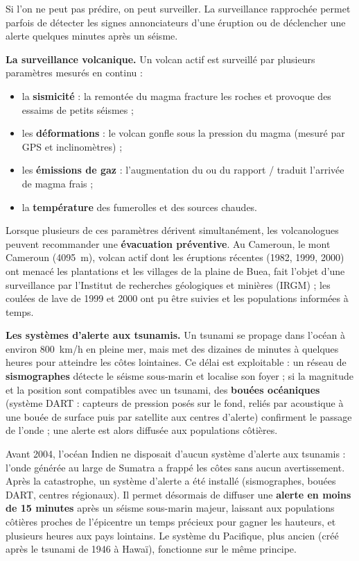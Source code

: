 \documentclass[11pt]{article}
\newcommand{\cle}[1]{{\popxbold\color{popdark}#1}}
\newcounter{popsec}
\newcounter{popsub}
\newcommand{\courssub}[1]{%
  \stepcounter{popsub}%
  \par\vspace{9pt}\noindent{\popxbold\fontsize{11.5}{13}\selectfont\color{popink}{\color{poporange}\thepopsec.\thepopsub}\hspace{6pt}#1}\par\nopagebreak\vspace{4pt}
}
\begin{document}
\courssub{La surveillance : des volcans aux tsunamis}

Si l'on ne peut pas prédire, on peut \cle{surveiller}. La surveillance rapprochée permet parfois de détecter les signes annonciateurs d'une éruption ou de déclencher une alerte quelques minutes après un séisme.

\textbf{La surveillance volcanique.} Un volcan actif est surveillé par plusieurs paramètres mesurés en continu :
\begin{itemize}
\item la \textbf{sismicité} : la remontée du magma fracture les roches et provoque des essaims de petits séismes ;
\item les \textbf{déformations} : le volcan gonfle sous la pression du magma (mesuré par GPS et inclinomètres) ;
\item les \textbf{émissions de gaz} : l'augmentation du  ou du rapport / traduit l'arrivée de magma frais ;
\item la \textbf{température} des fumerolles et des sources chaudes.
\end{itemize}
Lorsque plusieurs de ces paramètres dérivent simultanément, les volcanologues peuvent recommander une \textbf{évacuation préventive}. Au Cameroun, le mont Cameroun (\SI{4095}{m}), volcan actif dont les éruptions récentes (1982, 1999, 2000) ont menacé les plantations et les villages de la plaine de Buea, fait l'objet d'une surveillance par l'Institut de recherches géologiques et minières (IRGM) ; les coulées de lave de 1999 et 2000 ont pu être suivies et les populations informées à temps.

\textbf{Les systèmes d'alerte aux tsunamis.} Un tsunami se propage dans l'océan à environ \SI{800}{km/h} en pleine mer, mais met des dizaines de minutes à quelques heures pour atteindre les côtes lointaines. Ce délai est exploitable : un réseau de \textbf{sismographes} détecte le séisme sous-marin et localise son foyer ; si la magnitude et la position sont compatibles avec un tsunami, des \textbf{bouées océaniques} (système DART : capteurs de pression posés sur le fond, reliés par acoustique à une bouée de surface puis par satellite aux centres d'alerte) confirment le passage de l'onde ; une alerte est alors diffusée aux populations côtières.

\begin{exemplebox}
Avant 2004, l'océan Indien ne disposait d'aucun système d'alerte aux tsunamis : l'onde générée au large de Sumatra a frappé les côtes sans aucun avertissement. Après la catastrophe, un système d'alerte a été installé (sismographes, bouées DART, centres régionaux). Il permet désormais de diffuser une \textbf{alerte en moins de 15 minutes} après un séisme sous-marin majeur, laissant aux populations côtières proches de l'épicentre un temps précieux pour gagner les hauteurs, et plusieurs heures aux pays lointains. Le système du Pacifique, plus ancien (créé après le tsunami de 1946 à Hawaï), fonctionne sur le même principe.
\end{exemplebox}
\end{document}
